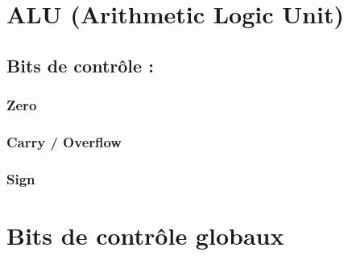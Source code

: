 \documentclass[twoside, 12pt, a4paper]{article}
\begin{document}
\section{ALU (Arithmetic Logic Unit)}
    \subsection{Bits de contrôle : }
        \subsubsection{Zero}
        \subsubsection{Carry / Overflow}
        \subsubsection{Sign}

\clearpage
    
\section{Bits de contrôle globaux}
\end{document}
